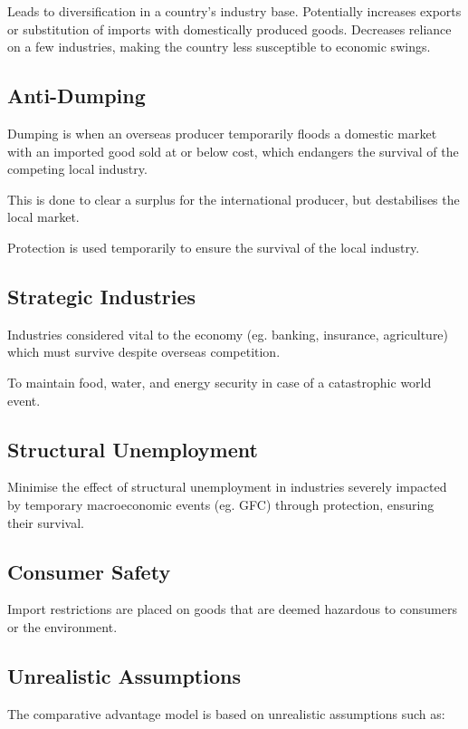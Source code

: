 \documentclass[a4paper,11pt]{article}
\begin{document}
Leads to diversification in a country's industry base. Potentially increases
exports or substitution of imports with domestically produced goods. Decreases
reliance on a few industries, making the country less susceptible to economic
swings.


\subsection{Anti-Dumping}

Dumping is when an overseas producer temporarily floods a domestic market with
an imported good sold at or below cost, which endangers the survival of the
competing local industry.

This is done to clear a surplus for the international producer, but destabilises
the local market.

Protection is used temporarily to ensure the survival of the local industry.


\subsection{Strategic Industries}

Industries considered vital to the economy (eg. banking, insurance, agriculture)
which must survive despite overseas competition.

To maintain food, water, and energy security in case of a catastrophic world
event.


\subsection{Structural Unemployment}

Minimise the effect of structural unemployment in industries severely impacted
by temporary macroeconomic events (eg. GFC) through protection, ensuring their
survival.


\subsection{Consumer Safety}

Import restrictions are placed on goods that are deemed hazardous to consumers
or the environment.


\subsection{Unrealistic Assumptions}

The comparative advantage model is based on unrealistic assumptions such as:
\end{document}
